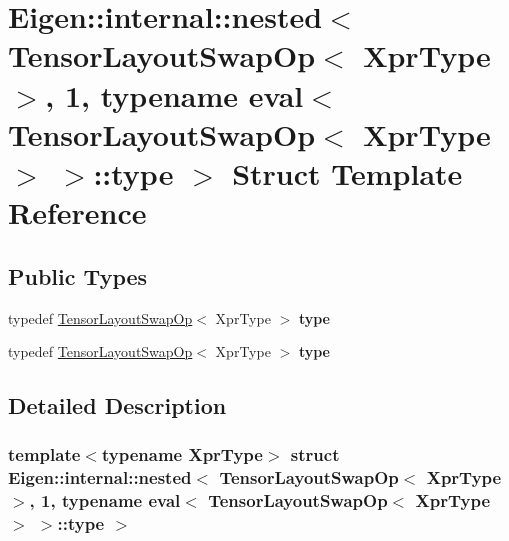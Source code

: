 \hypertarget{struct_eigen_1_1internal_1_1nested_3_01_tensor_layout_swap_op_3_01_xpr_type_01_4_00_011_00_01typ6254865c69b0d0586b21be5155c49fd7}{}\section{Eigen\+:\+:internal\+:\+:nested$<$ Tensor\+Layout\+Swap\+Op$<$ Xpr\+Type $>$, 1, typename eval$<$ Tensor\+Layout\+Swap\+Op$<$ Xpr\+Type $>$ $>$\+:\+:type $>$ Struct Template Reference}
\label{struct_eigen_1_1internal_1_1nested_3_01_tensor_layout_swap_op_3_01_xpr_type_01_4_00_011_00_01typ6254865c69b0d0586b21be5155c49fd7}
\subsection*{Public Types}
\begin{DoxyCompactItemize}
\item 
\mbox{\label{struct_eigen_1_1internal_1_1nested_3_01_tensor_layout_swap_op_3_01_xpr_type_01_4_00_011_00_01typ6254865c69b0d0586b21be5155c49fd7_ac2324daebe3f12e8c933608619be9c5d}} 
typedef \hyperlink{class_eigen_1_1_tensor_layout_swap_op}{Tensor\+Layout\+Swap\+Op}$<$ Xpr\+Type $>$ {\bfseries type}
\item 
\mbox{\label{struct_eigen_1_1internal_1_1nested_3_01_tensor_layout_swap_op_3_01_xpr_type_01_4_00_011_00_01typ6254865c69b0d0586b21be5155c49fd7_ac2324daebe3f12e8c933608619be9c5d}} 
typedef \hyperlink{class_eigen_1_1_tensor_layout_swap_op}{Tensor\+Layout\+Swap\+Op}$<$ Xpr\+Type $>$ {\bfseries type}
\end{DoxyCompactItemize}


\subsection{Detailed Description}
\subsubsection*{template$<$typename Xpr\+Type$>$\newline
struct Eigen\+::internal\+::nested$<$ Tensor\+Layout\+Swap\+Op$<$ Xpr\+Type $>$, 1, typename eval$<$ Tensor\+Layout\+Swap\+Op$<$ Xpr\+Type $>$ $>$\+::type $>$}



